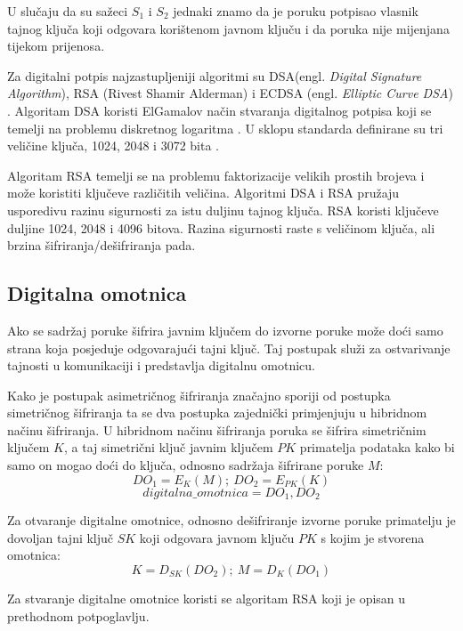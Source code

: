 U slučaju da su sažeci $S_1$ i $S_2$ jednaki znamo da je poruku potpisao vlasnik
tajnog
ključa koji odgovara korištenom javnom ključu i da poruka nije mijenjana tijekom
prijenosa.

Za digitalni potpis najzastupljeniji algoritmi su DSA(engl. \emph{Digital
Signature Algorithm}), RSA (Rivest Shamir Alderman) i ECDSA (engl.
\emph{Elliptic Curve DSA}) . Algoritam
DSA \cite{gallagher2013fips} koristi ElGamalov
način stvaranja digitalnog potpisa \cite[str. 395]{van2011encyclopedia} koji se temelji na
problemu diskretnog logaritma \cite[str. 352]{van2011encyclopedia}. U sklopu
standarda definirane su tri veličine ključa, 1024, 2048 i 3072 bita
\cite{gallagher2013fips}.

Algoritam RSA temelji se na problemu faktorizacije
velikih prostih brojeva i može koristiti ključeve različitih veličina. Algoritmi
DSA i RSA pružaju usporedivu razinu sigurnosti za istu duljinu
tajnog ključa. RSA koristi ključeve duljine 1024, 2048 i 4096 bitova.  Razina
sigurnosti raste s veličinom ključa, ali brzina šifriranja/dešifriranja pada.

\subsection{Digitalna omotnica}
Ako se sadržaj poruke šifrira javnim ključem do izvorne poruke može doći samo
strana
koja posjeduje odgovarajući tajni ključ. Taj postupak služi za ostvarivanje
tajnosti u komunikaciji i predstavlja digitalnu omotnicu.

Kako je postupak asimetričnog šifriranja značajno sporiji od postupka simetričnog
šifriranja ta se dva postupka zajednički primjenjuju u hibridnom načinu
šifriranja. U hibridnom načinu šifriranja poruka se šifrira simetričnim ključem
$K$, a taj simetrični ključ javnim ključem $PK$ primatelja podataka kako bi
samo on mogao doći do ključa, odnosno sadržaja šifrirane poruke $M$:
$$DO_1 = E_K(M);\ DO_2 = E_{PK}(K)$$
$$digitalna\_omotnica = DO_1, DO_2$$

Za otvaranje digitalne omotnice, odnosno dešifriranje izvorne poruke primatelju je
dovoljan tajni ključ $SK$ koji odgovara javnom ključu $PK$ s kojim je
stvorena omotnica:
$$K = D_{SK}(DO_2);\ M = D_{K}(DO_1)$$

Za stvaranje digitalne omotnice koristi se algoritam RSA koji je opisan u
prethodnom potpoglavlju.

